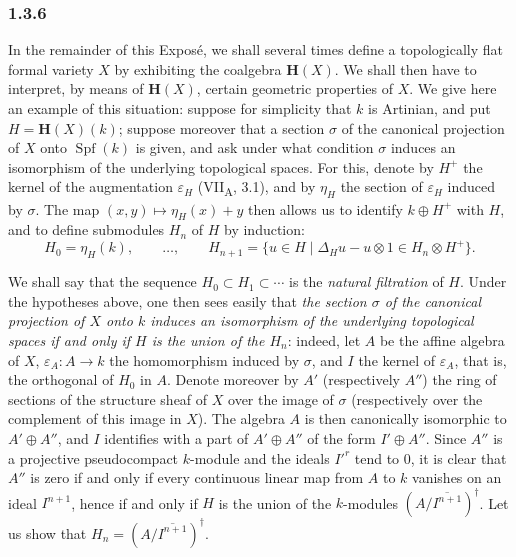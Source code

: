 
\subsubsection*{1.3.6}
\label{sga3:VIIB:1.3.6}

In the remainder of this Expos\'e, we shall several times define a
topologically flat formal variety \(X\) by exhibiting the coalgebra
\(\mathbf H(X)\). We shall then have to interpret, by means of
\(\mathbf H(X)\), certain geometric properties of \(X\). We give here an
example of this situation: suppose for simplicity that \(k\) is Artinian,
and put \(H=\mathbf H(X)(k)\); suppose moreover that a section \(\sigma\)
of the canonical projection of \(X\) onto \(\operatorname{Spf}(k)\) is
given, and ask under what condition \(\sigma\) induces an isomorphism of
the underlying topological spaces. For this, denote by \(H^+\) the kernel
of the augmentation \(\varepsilon_H\) (VII\textsubscript{A}, 3.1), and by
\(\eta_H\) the section of \(\varepsilon_H\) induced by \(\sigma\). The map
\((x,y)\mapsto\eta_H(x)+y\) then allows us to identify \(k\oplus H^+\)
with \(H\), and to define submodules \(H_n\) of \(H\) by induction:
\[
  H_0=\eta_H(k),
  \qquad\ldots,\qquad
  H_{n+1}=\{u\in H\mid\Delta_Hu-u\otimes1\in H_n\otimes H^+\}.
\]

We shall say that the sequence \(H_0\subset H_1\subset\cdots\) is the
\emph{natural filtration} of \(H\). Under the hypotheses above, one then
sees easily that \emph{the section \(\sigma\) of the canonical projection
of \(X\) onto \(k\) induces an isomorphism of the underlying topological
spaces if and only if \(H\) is the union of the \(H_n\)}: indeed, let
\(A\) be the affine algebra of \(X\), \(\varepsilon_A:A\to k\) the
homomorphism induced by \(\sigma\), and \(I\) the kernel of
\(\varepsilon_A\), that is, the orthogonal of \(H_0\) in \(A\). Denote
moreover by \(A'\) (respectively \(A''\)) the ring of sections of the
structure sheaf of \(X\) over the image of \(\sigma\) (respectively over
the complement of this image in \(X\)). The algebra \(A\) is then
canonically isomorphic to \(A'\oplus A''\), and \(I\) identifies with a
part of \(A'\oplus A''\) of the form \(I'\oplus A''\). Since \(A''\) is a
projective pseudocompact \(k\)-module and the ideals \(I'^r\) tend to
\(0\), it is clear that \(A''\) is zero if and only if every continuous
linear map from \(A\) to \(k\) vanishes on an ideal \(I^{n+1}\), hence if
and only if \(H\) is the union of the \(k\)-modules
\((A/\overline{I^{n+1}})^\dagger\). Let us show that
\(H_n=(A/\overline{I^{n+1}})^\dagger\).

